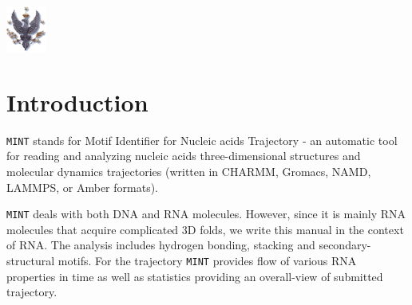 \documentclass[12pt]{article}
\begin{document}
     {}  \includegraphics[width=0.1\textwidth]{./pictures/logoUW.png}

\newpage
\tableofcontents
\newpage
\newcommand*{\elem}[1]{{\color{Gray}{\tt{<#1>}}}}
\newcommand*{\greyT}[1]{{\color{Gray}{\tt{#1}}}}

\section{Introduction}
{\tt MINT} stands for Motif Identifier for Nucleic acids Trajectory - an automatic tool for reading and analyzing nucleic acids three-dimensional structures and molecular dynamics trajectories (written in CHARMM, Gromacs, NAMD, LAMMPS, or Amber formats). 

{\tt MINT} deals with both DNA and RNA molecules. However, since it is mainly RNA molecules that acquire complicated 3D folds, we write this manual in the context of RNA. The analysis includes hydrogen bonding, stacking and secondary-structural motifs. For the trajectory {\tt MINT} provides  flow of various RNA properties in time as well as statistics providing an overall-view of submitted trajectory.\\
\end{document}
